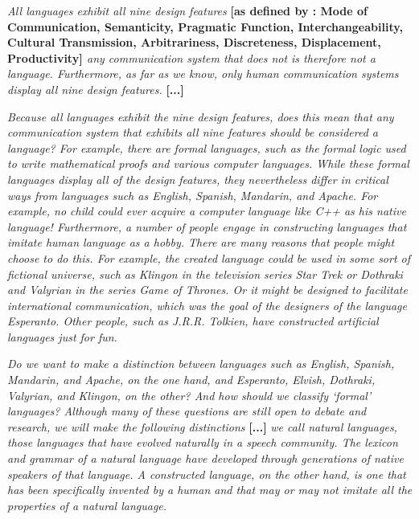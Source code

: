 \begin{myquote}   
\textit{All languages exhibit all nine design features} \textbf{{\small
[as defined by \citet{hockett1960origin}:
Mode of Communication, Semanticity, Pragmatic Function, Interchangeability, Cultural Transmission, Arbitrariness, Discreteness, Displacement, Productivity]
}
} \textit{any communication system that does not is therefore not a language. Furthermore, as far as we know, only human communication
systems display all nine design features.} \textbf{[...]}

\qquad \textit{Because all languages exhibit the nine design features, does this mean that any communication system that exhibits all nine features should be considered a language? 
For example, there are formal languages, such as the formal logic used to write mathematical proofs and various computer languages. While these formal languages display all of the design features, they nevertheless differ in critical ways from languages such as English, Spanish, Mandarin, and Apache. For example, no child could ever acquire a computer language like C++ as his native language! 
Furthermore, a number of people engage in constructing languages that imitate human language as a hobby. There are many reasons that people might choose to do this. For example, the created language could be used in some sort of fictional universe, such as Klingon in the television series Star Trek or Dothraki and Valyrian in the series Game of Thrones. Or it might be designed to facilitate international communication, which was the goal of the designers of the language Esperanto. Other people, such as J.R.R. Tolkien, have constructed artificial languages just for fun.}
\par
\qquad \textit{Do we want to make a distinction between languages such as English, Spanish, Mandarin, and Apache, on the one hand, and Esperanto, Elvish, Dothraki, Valyrian, and Klingon, on the other? And how should we classify `formal' languages?
Although many of these questions are still open to debate and research, we will make the following distinctions }
\textbf{[...]}
\textit{we call natural languages, those languages that have evolved naturally in a speech community. The lexicon and grammar of a natural language have developed through generations of native speakers of that language. A constructed language, on the other hand, is one that has been specifically invented by a human and that may or may not imitate all the properties of a natural language.} \\\citet{lang_file}
\end{myquote}


